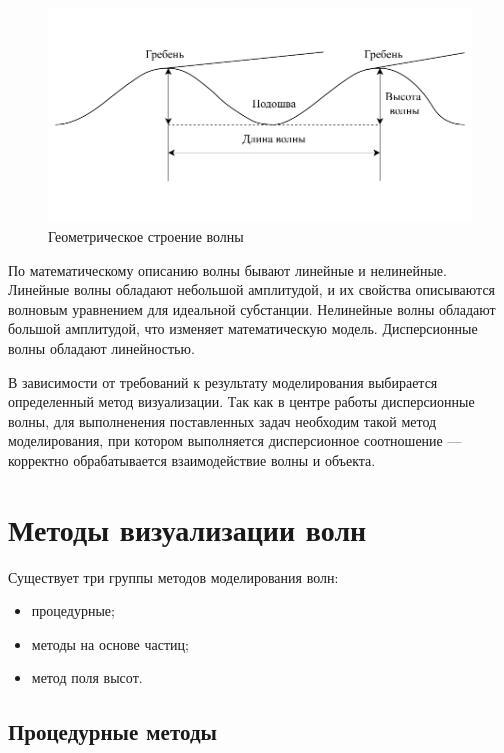 \begin{figure}[H]
	\begin{center}
		\includegraphics[scale=0.8]{img/wave.pdf}
	\end{center}
	\captionsetup{justification=centering}
	\caption{Геометрическое строение волны}
	\label{img:wave}
\end{figure}

По математическому описанию волны бывают линейные и нелинейные. Линейные волны обладают небольшой амплитудой, и их свойства описываются волновым уравнением для идеальной субстанции. Нелинейные волны обладают большой амплитудой, что изменяет математическую модель. Дисперсионные волны обладают линейностью.

В зависимости от требований к результату моделирования выбирается определенный метод визуализации. Так как в центре работы дисперсионные волны, для выполненения поставленных задач необходим такой метод моделирования, при котором выполняется дисперсионное соотношение --- корректно обрабатывается взаимодействие волны и объекта.

\section{Методы визуализации волн}

Существует три группы методов моделирования волн:

\begin{itemize}
    \item процедурные;
    \item методы на основе частиц;
    \item метод поля высот.
\end{itemize}

\subsection{Процедурные методы}

